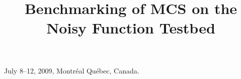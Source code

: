 \documentclass{sig-alternate}
\begin{document}
%
 {July 8--12, 2009, Montr\'eal Qu\'ebec, Canada.}

\title{Benchmarking of MCS on the Noisy Function
Testbed
}
%
%
%
%
%
\end{document}
